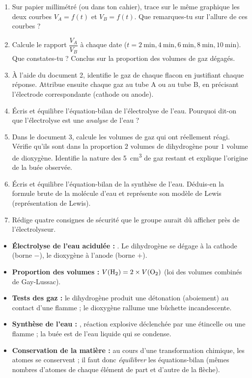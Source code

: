 \documentclass[11pt]{article}
\newcommand{\cle}[1]{{\popxbold\color{popdark}#1}}
\newcounter{popsec}
\newcounter{popsub}
\newcommand{\courssub}[1]{%
  \stepcounter{popsub}%
  \par\vspace{9pt}\noindent{\popxbold\fontsize{11.5}{13}\selectfont\color{popink}{\color{poporange}\thepopsec.\thepopsub}\hspace{6pt}#1}\par\nopagebreak\vspace{4pt}
}
\begin{document}
\begin{enumerate}
\item Sur papier millimétré (ou dans ton cahier), trace sur le même graphique les deux courbes $V_A = f(t)$ et $V_B = f(t)$. Que remarques-tu sur l'allure de ces courbes ?
\item Calcule le rapport $\dfrac{V_A}{V_B}$ à chaque date ($t = \SI{2}{\minute}, \SI{4}{\minute}, \SI{6}{\minute}, \SI{8}{\minute}, \SI{10}{\minute}$). Que constates-tu ? Conclus sur la proportion des volumes de gaz dégagés.
\item À l'aide du document 2, identifie le gaz de chaque flacon en justifiant chaque réponse. Attribue ensuite chaque gaz au tube A ou au tube B, en précisant l'électrode correspondante (cathode ou anode).
\item Écris et équilibre l'équation-bilan de l'électrolyse de l'eau. Pourquoi dit-on que l'électrolyse est une \emph{analyse} de l'eau ?
\item Dans le document 3, calcule les volumes de gaz qui ont réellement réagi. Vérifie qu'ils sont dans la proportion $2$ volumes de dihydrogène pour $1$ volume de dioxygène. Identifie la nature des \SI{5}{cm^3} de gaz restant et explique l'origine de la buée observée.
\item Écris et équilibre l'équation-bilan de la synthèse de l'eau. Déduis-en la formule brute de la molécule d'eau et représente son modèle de Lewis (représentation de Lewis).
\item Rédige quatre consignes de sécurité que le groupe aurait dû afficher près de l'électrolyseur.
\end{enumerate}

\courssub{Ressources : rappels de cours}

\begin{aretenir}
\begin{itemize}
\item \textbf{Électrolyse de l'eau acidulée :} . Le dihydrogène se dégage à la \cle{cathode} (borne $-$), le dioxygène à l'\cle{anode} (borne $+$).
\item \textbf{Proportion des volumes :} $V(\ce{H2}) = 2 \times V(\ce{O2})$ (loi des volumes combinés de Gay-Lussac).
\item \textbf{Tests des gaz :} le dihydrogène  produit une \cle{détonation} (aboiement) au contact d'une flamme ; le dioxygène  \cle{rallume} une bûchette incandescente.
\item \textbf{Synthèse de l'eau :} , réaction \cle{explosive} déclenchée par une étincelle ou une flamme ; la buée est de l'eau liquide qui se condense.
\item \textbf{Conservation de la matière :} au cours d'une transformation chimique, les atomes se conservent ; il faut donc \emph{équilibrer} les équations-bilan (mêmes nombres d'atomes de chaque élément de part et d'autre de la flèche).
\end{itemize}
\end{aretenir}
\end{document}
